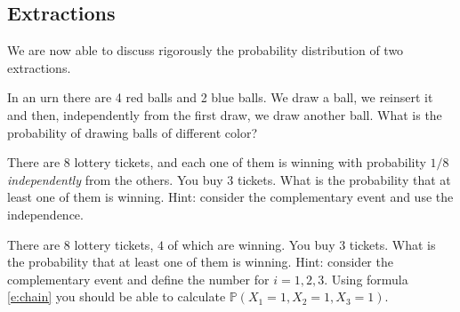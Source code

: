 \subsection{ Extractions}
We are now able to discuss rigorously the probability distribution of two extractions. 

\begin{ExerciseList}

\Exercise In an urn there are 4 red balls and 2 blue balls. We draw a ball, we reinsert it and then, independently from the first draw, we draw another ball. What is the probability of drawing balls of different color? 

\Exercise  There are $8$ lottery tickets, and each one of them is winning with probability $1/8$ \emph{independently} from the others. You buy $3$ tickets. What is the probability that at least one of them is winning.  Hint: consider the complementary event and use the independence. 

\Exercise There are $8$ lottery tickets, $4$ of which are winning. You buy $3$ tickets. What is the probability that at least one of them is winning.  Hint: consider the complementary event and
define the number  for $i=1,2,3$. Using formula \eqref{e:chain} you should be able to calculate $\mathbb{P}(X_1=1,X_2=1,X_3=1)$.


\end{ExerciseList}

